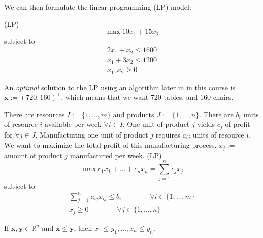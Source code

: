 \begin{exbox}
\begin{example}
        We can then formulate the linear programming (LP) model:

        (LP)
        \[\max 10x_1 + 15x_2\]
        subject to
        \begin{align*}
            2x_1 + x_2 \leqslant 1600 \\
            x_1 + 3x_2 \leqslant 1200 \\
            x_1, x_2 \geqslant  0
        \end{align*}

        An \emph{optimal} solution to the LP using an algorithm later in
        in this course is $ \bm{x}:=(720,160)^\top $, which means
        that we want $ 720 $ tables, and $ 160 $ chairs.
    \end{example}
\end{exbox}

\begin{exbox}
    \begin{example}
        There are resources $I:=\{1,\dots,m\}$ and products $J:=\{1,\dots,n\}$.
        There are $b_i$ units of resource
        $i$ available per week $\forall i\in I$. One unit of product $j$ yields $c_j$ of profit for
        $\forall j\in J$. Manufacturing one unit of product $j$ requires $a_{ij}$ units of resource $i$.
        We want to maximize the total profit of this manufacturing process.
        $x_j :=$ amount of product $j$ manufactured per week. (LP)
        \[\max c_1x_1 + \dots + c_nx_n = \sum\limits_{j=1}^n c_jx_j\]
        subject to
        \begin{align*}
            \sum\limits_{j=1}^n a_{ij}x_{ij}\leqslant b_i \qquad\qquad\forall i\in\{1,\dots,m\} \\
            x_{j}\geqslant  0 \qquad\qquad\forall j\in\{1,\dots,n\}
        \end{align*}
    \end{example}
\end{exbox}

\begin{remark}
    If $\bm{x},\bm{y}\in\mathbb{R}^n$ and $\bm{x}\leqslant \bm{y}$, then
    $x_1\leqslant  y_1, \ldots, x_n\leqslant y_n$.
\end{remark}


